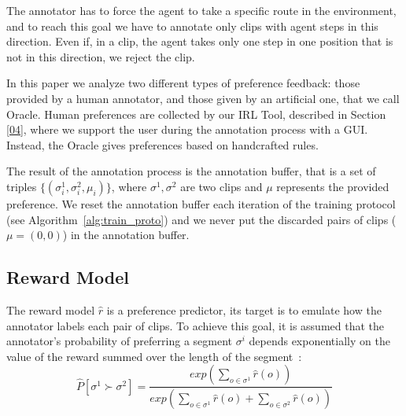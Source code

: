 The annotator has to force the agent to take a specific route in the environment, and to reach this goal we have to annotate only clips with agent steps in this direction. Even if, in a clip, the agent takes only one step in one position that is not in this direction, we reject the clip. 

In this paper we analyze two different types of preference feedback: those provided by a human annotator, and those given by an artificial one, that we call Oracle. Human preferences are collected by our IRL Tool, described in Section \ref{04}, where we support the user during the annotation process with a GUI. Instead, the Oracle gives preferences based on handcrafted rules.

The result of the annotation process is the annotation buffer, that is a set of triples $\{(\sigma^1_i, \sigma^2_i, \mu_i)\}$, where $\sigma^1, \sigma^2$ are two clips and $\mu$ represents the provided preference. We reset the annotation buffer each iteration of the training protocol (see Algorithm\ \ref{alg:train_proto}) and we never put the discarded pairs of clips ($\mu=(0,0)$) in the annotation buffer.


\subsection{Reward Model}
The reward model $\hat{r}$ is a preference predictor, its target is to emulate how the annotator labels each pair of clips. To achieve this goal, it is assumed that the annotator's probability of preferring a segment $\sigma^i$ depends exponentially on the value of the reward summed over the length of the segment\ \cite{NIPS2018_8025}:
\begin{equation}
    \hat{P}[\sigma^1 \succ \sigma^2] = \frac{exp(\sum_{o \in \sigma^1} \hat{r}(o))}{exp(\sum_{o \in \sigma^1} \hat{r}(o) + \sum_{o \in \sigma^2} \hat{r}(o))}
\end{equation}

